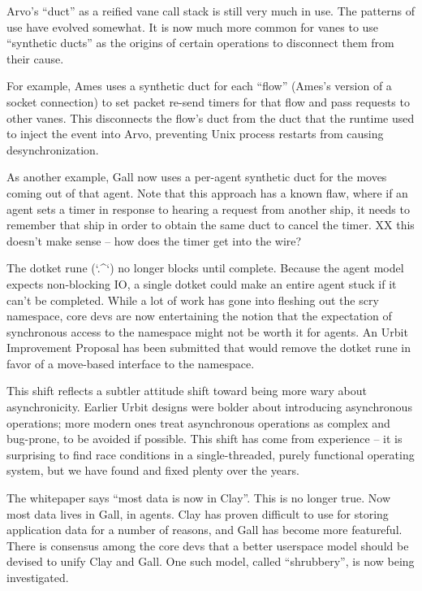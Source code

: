 \documentclass[twoside]{article}
\begin{document}
Arvo's ``duct'' as a reified vane call stack is still very much in use.  The patterns of use have evolved somewhat.  It is now much more common for vanes to use ``synthetic ducts'' as the origins of certain operations to disconnect them from their cause.

For example, Ames uses a synthetic duct for each ``flow'' (Ames's version of a socket connection) to set packet re-send timers for that flow and pass requests to other vanes.  This disconnects the flow's duct from the duct that the runtime used to inject the event into Arvo, preventing Unix process restarts from causing desynchronization.

As another example, Gall now uses a per-agent synthetic duct for the moves coming out of that agent.  Note that this approach has a known flaw, where if an agent sets a timer in response to hearing a request from another ship, it needs to remember that ship in order to obtain the same duct to cancel the timer.  XX this doesn't make sense – how does the timer get into the wire?

The dotket rune (`.^`) no longer blocks until complete.  Because the agent model expects non-blocking IO, a single dotket could make an entire agent stuck if it can't be completed.  While a lot of work has gone into fleshing out the scry namespace, core devs are now entertaining the notion that the expectation of synchronous access to the namespace might not be worth it for agents.  An Urbit Improvement Proposal has been submitted that would remove the dotket rune in favor of a move-based interface to the namespace.

This shift reflects a subtler attitude shift toward being more wary about asynchronicity.  Earlier Urbit designs were bolder about introducing asynchronous operations; more modern ones treat asynchronous operations as complex and bug-prone, to be avoided if possible.  This shift has come from experience – it is surprising to find race conditions in a single-threaded, purely functional operating system, but we have found and fixed plenty over the years.  

The whitepaper says ``most data is now in Clay''.  This is no longer true.  Now most data lives in Gall, in agents.  Clay has proven difficult to use for storing application data for a number of reasons, and Gall has become more featureful.  There is consensus among the core devs that a better userspace model should be devised to unify Clay and Gall.  One such model, called ``shrubbery'', is now being investigated.
\end{document}
